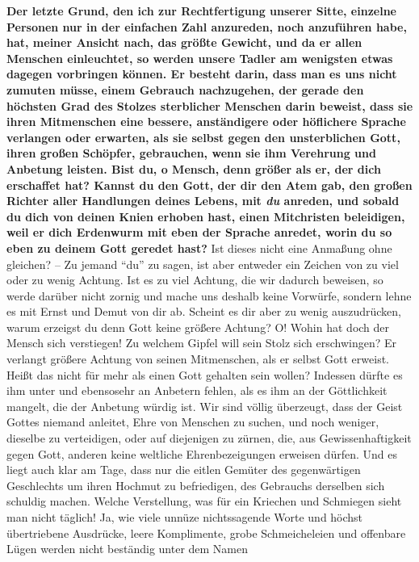 \label{ref:10_08_duzen} \textbf{Der letzte Grund, den ich zur Rechtfertigung
unserer Sitte, einzelne Personen
nur in der einfachen Zahl anzureden, noch anzuführen habe, hat, meiner Ansicht
nach, das größte Gewicht, und da er allen Menschen einleuchtet, so werden unsere
Tadler am wenigsten etwas dagegen vorbringen können. Er besteht darin, dass man
es uns nicht zumuten müsse, einem Gebrauch nachzugehen, der gerade den
höchsten Grad des Stolzes sterblicher Menschen darin beweist, dass sie ihren
Mitmenschen eine bessere, anständigere oder höflichere Sprache verlangen oder
erwarten, als sie selbst gegen den unsterblichen Gott, ihren großen Schöpfer,
gebrauchen, wenn sie ihm Verehrung und Anbetung leisten.  Bist du, o Mensch, denn
größer als er, der dich erschaffet hat? Kannst du den Gott, der dir den Atem
gab, den großen Richter aller Handlungen deines Lebens, mit \textit{du}
anreden, und
sobald du dich von deinen Knien erhoben hast, einen Mitchristen beleidigen, weil
er dich Erdenwurm mit eben der Sprache anredet, worin du so
eben zu deinem Gott
geredet hast?} Ist dieses nicht eine Anmaßung ohne gleichen? -- Zu jemand "`du"' zu
sagen, ist aber entweder ein Zeichen von zu viel oder zu wenig Achtung. Ist
es zu viel Achtung, die wir dadurch beweisen, so werde darüber nicht zornig und
mache uns deshalb keine Vorwürfe, sondern lehne es mit Ernst und Demut von
dir ab. Scheint es dir aber zu wenig auszudrücken, warum erzeigst du denn Gott
keine größere Achtung? O! Wohin hat doch der Mensch sich verstiegen! Zu welchem
Gipfel will sein Stolz sich erschwingen? Er verlangt größere Achtung von seinen
Mitmenschen, als er selbst Gott erweist. Heißt das nicht für mehr als einen
Gott gehalten sein wollen? Indessen dürfte es ihm unter und ebensosehr an
Anbetern fehlen, als es ihm an der Göttlichkeit mangelt, die der Anbetung würdig
ist. Wir sind völlig überzeugt, dass der Geist Gottes niemand anleitet, Ehre von
Menschen zu suchen, und noch weniger, dieselbe zu verteidigen, oder auf
diejenigen zu zürnen, die, aus Gewissenhaftigkeit gegen Gott, anderen keine
weltliche Ehrenbezeigungen erweisen dürfen. Und es liegt auch klar am Tage, dass
nur die eitlen Gemüter des gegenwärtigen Geschlechts um ihren Hochmut zu
befriedigen, des Gebrauchs derselben sich schuldig machen. Welche Verstellung,
was für ein Kriechen und Schmiegen sieht man nicht täglich! Ja,
wie viele
unnüze nichtssagende Worte und höchst übertriebene Ausdrücke, leere Komplimente,
grobe Schmeicheleien und offenbare Lügen werden nicht beständig unter dem Namen
